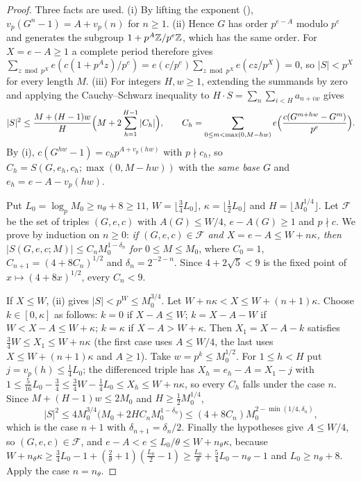 \documentclass[11pt]{article}
\begin{document}
\begin{proof}
Three facts are used. (i) By lifting the exponent (), $v_p(G^n-1)=A+v_p(n)$ for $n\ge1$.
(ii) Hence $G$ has order $p^{e-A}$ modulo $p^e$ and generates the subgroup $1+p^A\mathbb Z/p^e\mathbb Z$, which has
the same order. For $X=e-A\ge1$ a complete period therefore gives
$\sum_{z\bmod p^X}e(c(1+p^Az)/p^e)=e(c/p^e)\sum_{z\bmod p^X}e(cz/p^X)=0$, so $|S|<p^X$ for every length
$M$. (iii) For integers $H,w\ge1$, extending the summands by zero and applying the Cauchy--Schwarz
inequality to $H\cdot S=\sum_n\sum_{i<H}a_{n+iw}$ gives
\[
|S|^2\le\frac{M+(H-1)w}{H}\Bigl(M+2\sum_{h=1}^{H-1}|C_h|\Bigr),\qquad
C_h=\sum_{0\le m<\max(0,M-hw)}e\Bigl(\frac{c(G^{m+hw}-G^m)}{p^e}\Bigr).
\]
By (i), $c(G^{hw}-1)=c_hp^{A+v_p(hw)}$ with $p\nmid c_h$, so $C_h=S(G,e_h,c_h;\max(0,M-hw))$ with the
\emph{same base} $G$ and $e_h=e-A-v_p(hw)$.

Put $L_0=\log_pM_0\ge n_\theta+8\ge11$, $W=\lfloor\frac34L_0\rfloor$, $\kappa=\lfloor\frac12L_0\rfloor$ and
$H=\lfloor M_0^{1/4}\rfloor$. Let $\mathcal F$ be the set of triples $(G,e,c)$ with $A(G)\le W/4$,
$e-A(G)\ge1$ and $p\nmid c$. We prove by induction on $n\ge0$: \emph{if $(G,e,c)\in\mathcal F$ and
$X=e-A\le W+n\kappa$, then $|S(G,e,c;M)|\le C_nM_0^{1-\delta_n}$ for $0\le M\le M_0$}, where $C_0=1$,
$C_{n+1}=(4+8C_n)^{1/2}$ and $\delta_n=2^{-2-n}$. Since $4+2\sqrt5<9$ is the fixed point of
$x\mapsto(4+8x)^{1/2}$, every $C_n<9$.

If $X\le W$, (ii) gives $|S|<p^W\le M_0^{3/4}$. Let $W+n\kappa<X\le W+(n+1)\kappa$. Choose $k\in[0,\kappa]$
as follows: $k=0$ if $X-A\le W$; $k=X-A-W$ if $W<X-A\le W+\kappa$; $k=\kappa$ if $X-A>W+\kappa$. Then
$X_1=X-A-k$ satisfies $\frac34W\le X_1\le W+n\kappa$ (the first case uses $A\le W/4$, the last uses
$X\le W+(n+1)\kappa$ and $A\ge1$). Take $w=p^k\le M_0^{1/2}$. For $1\le h<H$ put $j=v_p(h)\le\frac14L_0$;
the differenced triple has $X_h=e_h-A=X_1-j$ with
$1\le\frac5{16}L_0-\frac34\le\frac34W-\frac14L_0\le X_h\le W+n\kappa$, so every $C_h$ falls under the case
$n$. Since $M+(H-1)w\le2M_0$ and $H\ge\frac12M_0^{1/4}$,
\[
|S|^2\le4M_0^{3/4}\bigl(M_0+2HC_nM_0^{1-\delta_n}\bigr)\le(4+8C_n)M_0^{2-\min(1/4,\delta_n)},
\]
which is the case $n+1$ with $\delta_{n+1}=\delta_n/2$. Finally the hypotheses give $A\le W/4$, so
$(G,e,c)\in\mathcal F$, and $e-A<e\le L_0/\theta\le W+n_\theta\kappa$, because
$W+n_\theta\kappa\ge\frac34L_0-1+(\frac2\theta+1)(\frac{L_0}2-1)\ge\frac{L_0}\theta+\frac54L_0-n_\theta-1$
and $L_0\ge n_\theta+8$. Apply the case $n=n_\theta$.
\end{proof}
\end{document}
